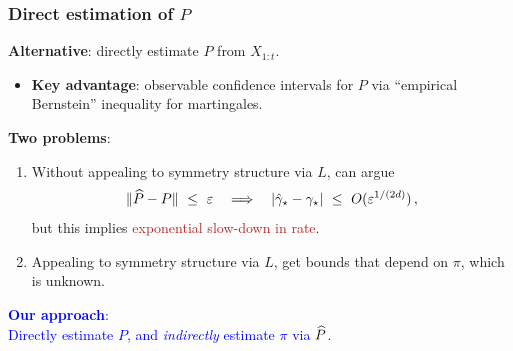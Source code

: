 \documentclass[11pt,compress,blue4,notheorems,handout]{beamer}
\newcommand{\BLUE}[1]{\textcolor{blue}{#1}}
\newcommand{\FIREBRICK}[1]{\textcolor{firebrick}{#1}}
\newcommand\gap{\ensuremath{\gamma_{\star}}}
\newcommand\hatgap{\ensuremath{\hat{\gamma}_{\star}}}
\begin{document}
\begin{frame}
  \frametitle{Direct estimation of $P$}

  \textbf{Alternative}: directly estimate $P$ from $X_{1:t}$.

  \begin{itemize}
    \item<2->
      \textbf{Key advantage}: observable confidence intervals for $P$
      via ``empirical Bernstein'' inequality for martingales.

  \end{itemize}

  \textbf{Two problems}:
  \begin{enumerate}
    \item<4->
      Without appealing to symmetry structure via $L$, can argue
      \[
        \norm{\wh{P} - P} \ \leq \ \veps
        \quad\Longrightarrow\quad
        \abs{\hatgap - \gap} \ \leq \ O(\veps^{1/(2d)})
        \,,
      \]
      but this implies \FIREBRICK{exponential slow-down in rate}.

      \medskip

    \item<5->
      Appealing to symmetry structure via $L$, get bounds that depend
      on $\pi$, which is unknown.

  \end{enumerate}

  \begin{center}
    \BLUE{%
      \textbf{Our approach}: \\
      Directly estimate $P$, and \emph{indirectly} estimate $\pi$ via
      $\widehat P$.
    }
  \end{center}

\end{frame}

\end{document}
